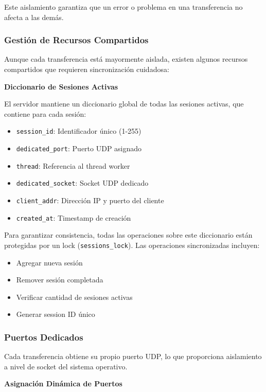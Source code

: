 Este aislamiento garantiza que un error o problema en una transferencia no afecta a las demás.

\subsubsection{Gestión de Recursos Compartidos}

Aunque cada transferencia está mayormente aislada, existen algunos recursos compartidos que requieren sincronización cuidadosa:

\textbf{Diccionario de Sesiones Activas}

El servidor mantiene un diccionario global de todas las sesiones activas, que contiene para cada sesión:

\begin{itemize}
    \item \texttt{session\_id}: Identificador único (1-255)
    \item \texttt{dedicated\_port}: Puerto UDP asignado
    \item \texttt{thread}: Referencia al thread worker
    \item \texttt{dedicated\_socket}: Socket UDP dedicado
    \item \texttt{client\_addr}: Dirección IP y puerto del cliente
    \item \texttt{created\_at}: Timestamp de creación
\end{itemize}

Para garantizar consistencia, todas las operaciones sobre este diccionario están protegidas por un lock (\texttt{sessions\_lock}). Las operaciones sincronizadas incluyen:

\begin{itemize}
    \item Agregar nueva sesión
    \item Remover sesión completada
    \item Verificar cantidad de sesiones activas
    \item Generar session ID único
\end{itemize}

\subsubsection{Puertos Dedicados}

Cada transferencia obtiene su propio puerto UDP, lo que proporciona aislamiento a nivel de socket del sistema operativo.

\textbf{Asignación Dinámica de Puertos}


